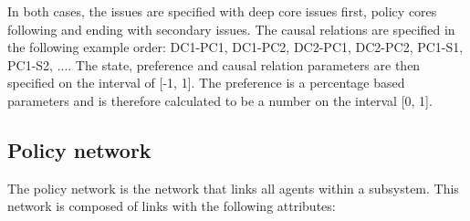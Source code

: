 In both cases, the issues are specified with deep core issues first, policy cores following and ending with secondary issues. The causal relations are specified in the following example order: DC1-PC1, DC1-PC2, DC2-PC1, DC2-PC2, PC1-S1, PC1-S2, .... The state, preference and causal relation parameters are then specified on the interval of [-1, 1]. The preference is a percentage based parameters and is therefore calculated to be a number on the interval [0, 1].

\subsection{Policy network}

The policy network is the network that links all agents within a subsystem. This network is composed of links with the following attributes: 

